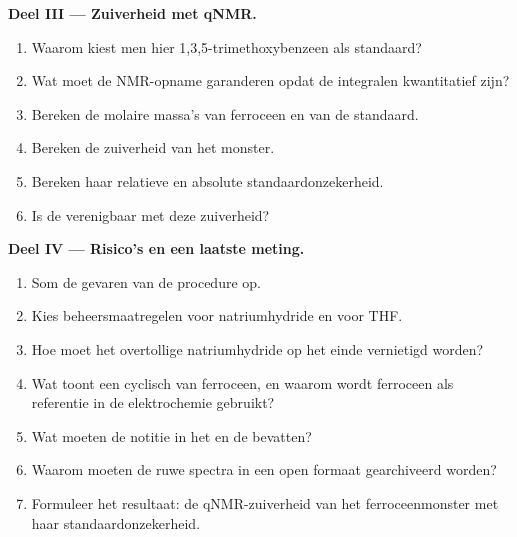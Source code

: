\begin{problem}
\medskip\noindent\textbf{Deel III --- Zuiverheid met qNMR.}
\begin{enumerate}[resume]
  \item Waarom kiest men hier 1,3,5-trimethoxybenzeen als standaard?
  \item Wat moet de NMR-opname garanderen opdat de integralen kwantitatief
        zijn?
  \item Bereken de molaire massa's van ferroceen en van de standaard.
  \item Bereken de zuiverheid van het monster.
  \item Bereken haar relatieve en absolute standaardonzekerheid.
  \item Is de  verenigbaar met deze zuiverheid?
\end{enumerate}

\medskip\noindent\textbf{Deel IV --- Risico's en een laatste meting.}
\begin{enumerate}[resume]
  \item Som de gevaren van de procedure op.
  \item Kies beheersmaatregelen voor natriumhydride en voor THF.
  \item Hoe moet het overtollige natriumhydride op het einde vernietigd
        worden?
  \item Wat toont een cyclisch  van ferroceen, en waarom wordt
        ferroceen als referentie in de elektrochemie gebruikt?
  \item Wat moeten de notitie in het  en de  bevatten?
  \item Waarom moeten de ruwe spectra in een open formaat gearchiveerd
        worden?
  \item Formuleer het resultaat: de qNMR-zuiverheid van het ferroceenmonster met haar standaardonzekerheid.
\end{enumerate}
\end{problem}
